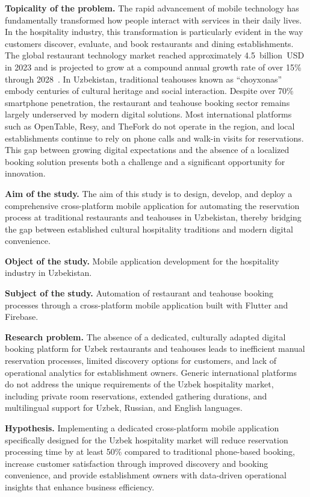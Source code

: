 
\textbf{Topicality of the problem.}
The rapid advancement of mobile technology has fundamentally transformed how people interact with services in their daily lives.
In the hospitality industry, this transformation is particularly evident in the way customers discover, evaluate, and book restaurants and dining establishments.
The global restaurant technology market reached approximately 4.5~billion~USD in 2023 and is projected to grow at a compound annual growth rate of over 15\% through 2028~\cite{gartner2023}.
In Uzbekistan, traditional teahouses known as ``choyxonas'' embody centuries of cultural heritage and social interaction.
Despite over 70\% smartphone penetration, the restaurant and teahouse booking sector remains largely underserved by modern digital solutions.
Most international platforms such as OpenTable, Resy, and TheFork do not operate in the region, and local establishments continue to rely on phone calls and walk-in visits for reservations.
This gap between growing digital expectations and the absence of a localized booking solution presents both a challenge and a significant opportunity for innovation.

\textbf{Aim of the study.}
The aim of this study is to design, develop, and deploy a comprehensive cross-platform mobile application for automating the reservation process at traditional restaurants and teahouses in Uzbekistan, thereby bridging the gap between established cultural hospitality traditions and modern digital convenience.

\textbf{Object of the study.}
Mobile application development for the hospitality industry in Uzbekistan.

\textbf{Subject of the study.}
Automation of restaurant and teahouse booking processes through a cross-platform mobile application built with Flutter and Firebase.

\textbf{Research problem.}
The absence of a dedicated, culturally adapted digital booking platform for Uzbek restaurants and teahouses leads to inefficient manual reservation processes, limited discovery options for customers, and lack of operational analytics for establishment owners.
Generic international platforms do not address the unique requirements of the Uzbek hospitality market, including private room reservations, extended gathering durations, and multilingual support for Uzbek, Russian, and English languages.

\textbf{Hypothesis.}
Implementing a dedicated cross-platform mobile application specifically designed for the Uzbek hospitality market will reduce reservation processing time by at least 50\% compared to traditional phone-based booking, increase customer satisfaction through improved discovery and booking convenience, and provide establishment owners with data-driven operational insights that enhance business efficiency.


